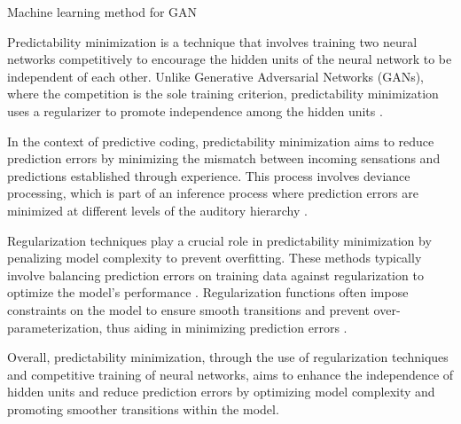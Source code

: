 Machine learning method for GAN



Predictability minimization is a technique that involves training two neural networks competitively to encourage the hidden units of the neural network to be independent of each other. Unlike Generative Adversarial Networks (GANs), where the competition is the sole training criterion, predictability minimization uses a regularizer to promote independence among the hidden units \citep{10.1145/2640087.2644155}.

In the context of predictive coding, predictability minimization aims to reduce prediction errors by minimizing the mismatch between incoming sensations and predictions established through experience. This process involves deviance processing, which is part of an inference process where prediction errors are minimized at different levels of the auditory hierarchy \citep{10.3389/fnhum.2015.00505}.

Regularization techniques play a crucial role in predictability minimization by penalizing model complexity to prevent overfitting. These methods typically involve balancing prediction errors on training data against regularization to optimize the model's performance \citep{10.1186/1471-2105-16-s16-s2}. Regularization functions often impose constraints on the model to ensure smooth transitions and prevent over-parameterization, thus aiding in minimizing prediction errors \citep{10.1007/978-1-4615-5339-7_102}.

Overall, predictability minimization, through the use of regularization techniques and competitive training of neural networks, aims to enhance the independence of hidden units and reduce prediction errors by optimizing model complexity and promoting smoother transitions within the model.


